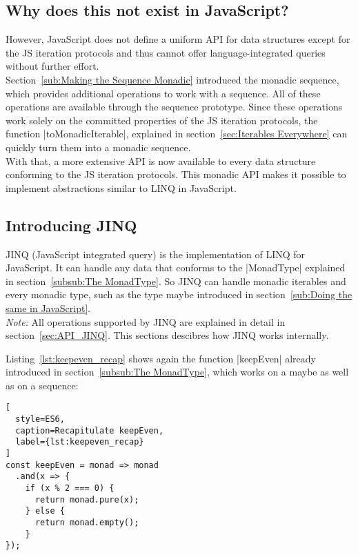 \subsection{Why does this not exist in JavaScript?} %
\label{sub:Why does this not exist in JavaScript?}
However, JavaScript does not define a uniform API for data structures except
for the JS iteration protocols and thus cannot offer language-integrated queries
without further effort. \\
Section~\ref{sub:Making the Sequence Monadic} introduced the monadic sequence,
which provides additional operations to work with a sequence. All of these
operations are available through the sequence prototype. Since these
operations work solely on the committed properties of the JS iteration
protocols, the function |toMonadicIterable|, explained in
section~\ref{sec:Iterables Everywhere} can quickly turn them into a monadic
sequence.\\
With that, a more extensive API is now available to every data structure
conforming to the JS iteration protocols. This monadic API makes it possible to
implement abstractions similar to LINQ in JavaScript.

\subsection{Introducing JINQ} %
\label{sub:Introducing JINQ}
JINQ (JavaScript integrated query) is the implementation of LINQ for
JavaScript. It can handle any data that conforms to the |MonadType| explained
in section~\ref{subsub:The MonadType}. So JINQ can handle monadic iterables and
every monadic type, such as the type maybe introduced in
section~\ref{sub:Doing the same in JavaScript}.\\
\textit{Note:} All operations supported by JINQ are explained in detail in 
section~\ref{sec:API_JINQ}. This sections descibres how JINQ works
internally.

Listing~\ref{lst:keepeven_recap} shows again the function |keepEven| already
introduced in section~\ref{subsub:The MonadType}, which works on a maybe as
well as on a sequence:
\begin{lstlisting}[
  style=ES6,
  caption=Recapitulate keepEven,
  label={lst:keepeven_recap}
]
const keepEven = monad => monad
  .and(x => {
    if (x % 2 === 0) {
      return monad.pure(x);
    } else {
      return monad.empty();
    }
}); 
\end{lstlisting}

